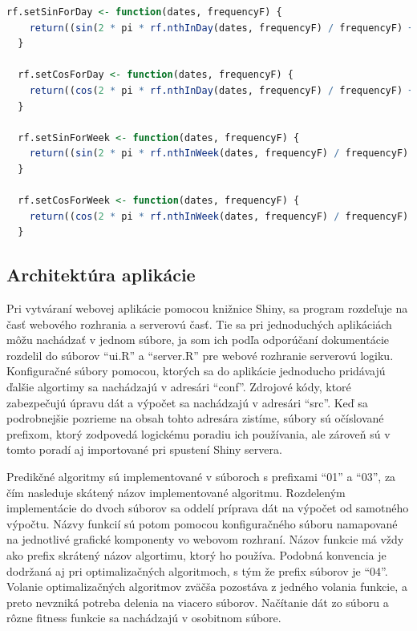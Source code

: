 \documentclass[a4paper,slovak,12pt,appendix]{article}
\begin{document}
\begin{lstlisting}[language=R]
  rf.setSinForDay <- function(dates, frequencyF) {
    return((sin(2 * pi * rf.nthInDay(dates, frequencyF) / frequencyF) + 1) / 2)
  }

  rf.setCosForDay <- function(dates, frequencyF) {
    return((cos(2 * pi * rf.nthInDay(dates, frequencyF) / frequencyF) + 1) / 2)
  }

  rf.setSinForWeek <- function(dates, frequencyF) {
    return((sin(2 * pi * rf.nthInWeek(dates, frequencyF) / frequencyF) + 1) / 2)
  }

  rf.setCosForWeek <- function(dates, frequencyF) {
    return((cos(2 * pi * rf.nthInWeek(dates, frequencyF) / frequencyF) + 1) / 2)
  }
\end{lstlisting}


\subsection{Architektúra aplikácie}
Pri vytváraní webovej aplikácie pomocou knižnice Shiny, sa program rozdeľuje na
časť webového rozhrania a serverovú časť. Tie sa pri jednoduchých aplikáciách
môžu nachádzať v jednom súbore, ja som ich podľa odporúčaní dokumentácie
rozdelil do súborov ``ui.R'' a ``server.R'' pre webové rozhranie serverovú
logiku. Konfiguračné súbory pomocou, ktorých sa do aplikácie jednoducho
pridávajú ďalšie algortimy sa nachádzajú v adresári ``conf''. Zdrojové kódy,
ktoré zabezpečujú úpravu dát a výpočet sa nachádzajú v adresári ``src''.
Keď sa podrobnejšie pozrieme na obsah tohto adresára zistíme, súbory sú
očíslované prefixom, ktorý zodpovedá logickému poradiu ich používania, ale
zároveň sú v tomto poradí aj importované pri spustení Shiny servera.

Predikčné algoritmy sú implementované v súboroch s prefixami ``01'' a ``03'',
za čím nasleduje skátený názov implementované algoritmu. Rozdeleným
implementácie do dvoch súborov sa oddelí príprava dát na výpočet od samotného
výpočtu. Názvy funkcií sú potom pomocou konfiguračného súboru namapované na
jednotlivé grafické komponenty vo webovom rozhraní. Názov funkcie má vždy ako
prefix skrátený názov algortimu, ktorý ho používa. Podobná konvencia je
dodržaná aj pri optimalizačných algoritmoch, s tým že prefix súborov je ``04''.
Volanie optimalizačných algoritmov zväčša pozostáva z jedného volania funkcie,
a preto nevzniká potreba delenia na viacero súborov. Načítanie dát zo súboru
a rôzne fitness funkcie sa nachádzajú v osobitnom súbore.
\end{document}
